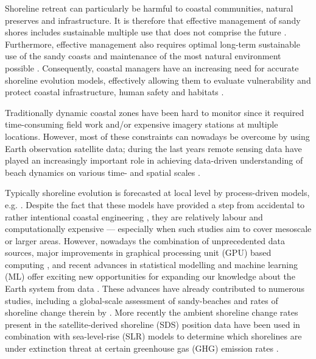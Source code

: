 \documentclass[format=sigconf, review=false, screen=true]{acmart}
\begin{document}
Shoreline retreat can particularly be harmful to coastal communities,  natural preserves and infrastructure. It is therefore that effective management of sandy shores includes sustainable multiple use that does not comprise the future \citep{Brown2010ecology}. Furthermore, effective management also requires optimal long-term sustainable use of the sandy coasts and maintenance of the most natural environment possible \citep{Brown2010ecology}. Consequently, coastal managers have an increasing need for accurate shoreline evolution models, effectively allowing them to evaluate vulnerability and protect coastal infrastructure, human safety and habitats \citep{Long2012extended}. 

Traditionally dynamic coastal zones have been hard to monitor since it required time-consuming field work and/or expensive imagery stations at multiple locations. However, most of these constraints can nowadays be overcome by using Earth observation satellite data; during the last years remote sensing data have played an increasingly important role in achieving data-driven understanding of beach dynamics on various time- and spatial scales \citep{Luijendijk2018state, Murray2018global, Vos2019sub, harley2019shoreline}.

Typically shoreline evolution is forecasted at local level by process-driven models, e.g. \citep{Davidson2010forecasting, Davidson2011effect, Long2012extended}. Despite the fact that these models have provided a step from accidental to rather intentional coastal engineering \citep{Kras2019shoreline}, they are relatively labour and computationally expensive --- especially when such studies aim to cover mesoscale or larger areas. 
However, nowadays the combination of unprecedented data sources, major improvements in graphical processing unit (GPU) based computing \citep{raina2009large}, and recent advances in statistical modelling and machine learning (ML) offer exciting new opportunities for expanding our knowledge about the Earth system from data \citep{Reichstein2019deep}. These advances have already contributed to numerous studies, including a global-scale assessment of sandy-beaches and rates of shoreline change therein by \citet{Luijendijk2018state}. More recently the ambient shoreline change rates present in the \citet{Luijendijk2018state} satellite-derived shoreline (SDS) position data have been used in combination with sea-level-rise (SLR) models to determine which shorelines are under extinction threat at certain greenhouse gas (GHG) emission rates \citep{vousdoukas2020sandy}. 
\end{document}
